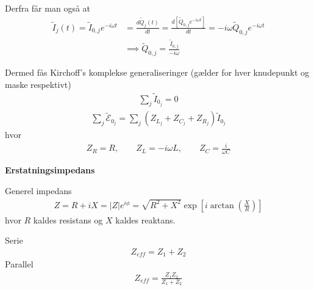 \documentclass[a4paper]{article}
\begin{document}
    Derfra får man også at \begin{align*}
        \tilde{I}_{j} (t) = \tilde{I}_{0,j} e^{-i \omega t} &= \frac{d\tilde{Q}_{j} (t)}{dt} = \frac{d \left[  \tilde{Q}_{0, j} e^{-i \omega t} \right]}{dt} = -i \omega \tilde{Q}_{0, j} e^{-i \omega t}\\
        &\implies \boxed{\tilde{Q}_{0, j} = \frac{\tilde{I}_{0, j}}{-i \omega }} \tag{K(58)}
    \end{align*}


    Dermed fås Kirchoff's komplekse generaliseringer (gælder for hver knudepunkt og maske respektivt)\begin{align*}
        \boxed{\sum_{j} \tilde{I}_{0_j} = 0} \tag{K(59)}
    \end{align*}
    \begin{align*}
        \boxed{\sum_{j} \tilde{\mathcal{E}}_{0_j} = \sum_{j} \left(Z_{L_j} + Z_{C_j} + Z_{R_j}\right)\tilde{I}_{0_j}} \tag{K(60)}
    \end{align*}
    hvor \begin{align*}
        \boxed{Z_R = R,\qquad Z_L = -i \omega L, \qquad Z_C = \frac{i}{\omega C}}\tag{K(61)}
    \end{align*}
    
    \textbf{Erstatningsimpedans}
    
    Generel impedans \begin{align*}
        Z = R + i X = |Z| e^{i \phi } = \sqrt{R^2 + X^2} \exp \left[i \arctan\left( \frac{X}{R} \right) \tag{K(64)}\right] 
    \end{align*} hvor \(R\) kaldes resistans og \(X\) kaldes reaktans. 
    
    Serie \begin{align*}
        Z_{eff} = Z_1 + Z_2 
    \end{align*} 
    Parallel \begin{align*}
        Z_{eff} = \frac{Z_{1}Z_2}{Z_1 + Z_{2}}  
    \end{align*}
\end{document}

